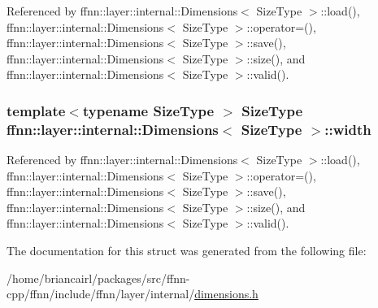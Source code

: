Referenced by ffnn\-::layer\-::internal\-::\-Dimensions$<$ Size\-Type $>$\-::load(), ffnn\-::layer\-::internal\-::\-Dimensions$<$ Size\-Type $>$\-::operator=(), ffnn\-::layer\-::internal\-::\-Dimensions$<$ Size\-Type $>$\-::save(), ffnn\-::layer\-::internal\-::\-Dimensions$<$ Size\-Type $>$\-::size(), and ffnn\-::layer\-::internal\-::\-Dimensions$<$ Size\-Type $>$\-::valid().

\hypertarget{structffnn_1_1layer_1_1internal_1_1_dimensions_a1fac884bf9c7468e9408143195afc989}{
\subsubsection[{width}]{\setlength{\rightskip}{0pt plus 5cm}template$<$typename Size\-Type $>$ Size\-Type {\bf ffnn\-::layer\-::internal\-::\-Dimensions}$<$ Size\-Type $>$\-::width}}\label{structffnn_1_1layer_1_1internal_1_1_dimensions_a1fac884bf9c7468e9408143195afc989}


Referenced by ffnn\-::layer\-::internal\-::\-Dimensions$<$ Size\-Type $>$\-::load(), ffnn\-::layer\-::internal\-::\-Dimensions$<$ Size\-Type $>$\-::operator=(), ffnn\-::layer\-::internal\-::\-Dimensions$<$ Size\-Type $>$\-::save(), ffnn\-::layer\-::internal\-::\-Dimensions$<$ Size\-Type $>$\-::size(), and ffnn\-::layer\-::internal\-::\-Dimensions$<$ Size\-Type $>$\-::valid().



The documentation for this struct was generated from the following file\-:\begin{DoxyCompactItemize}
\item 
/home/briancairl/packages/src/ffnn-\/cpp/ffnn/include/ffnn/layer/internal/\hyperlink{dimensions_8h}{dimensions.\-h}\end{DoxyCompactItemize}
